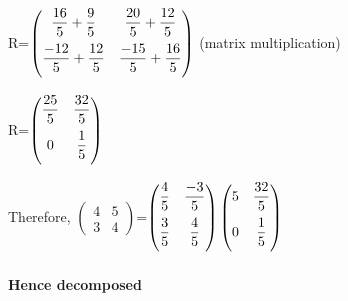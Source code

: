 \documentclass[a4paper,12pt]{article}
\begin{document}
R=$\begin{pmatrix} \dfrac{16}{5}+\dfrac{9}{5} \vspace*{2mm} & \dfrac{20}{5}+\dfrac{12}{5} \\ \dfrac{-12}{5}+\dfrac{12}{5} \vspace*{2mm} & \dfrac{-15}{5}+\dfrac{16}{5} \end{pmatrix}$  \hspace*{3cm}(matrix multiplication)\\

\vspace{0.5cm}

R=$\begin{pmatrix} \dfrac{25}{5} \vspace*{2mm} & \dfrac{32}{5} \\ 0 \vspace*{2mm} & \dfrac{1}{5} \end{pmatrix}$\\

\vspace{0.5cm}

Therefore, {\huge $\begin{pmatrix} 4 & 5  \\ 3 & 4 \end{pmatrix}$}=$\begin{pmatrix} \dfrac{4}{5} \vspace*{2mm} & \dfrac{-3}{5} \\ \dfrac{3}{5} \vspace*{2mm} & \dfrac{4}{5} \end{pmatrix}$$\begin{pmatrix} 5 \vspace*{2mm} & \dfrac{32}{5} \\ 0 \vspace*{2mm} & \dfrac{1}{5} \end{pmatrix}$\\
\\
\textbf{Hence decomposed}
\end{document}

